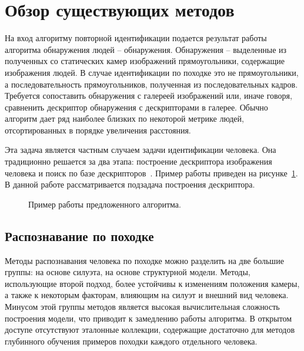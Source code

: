 \documentclass[a4paper,twoside,11pt]{article}
\numberwithin{equation}{section}
\begin{document}
\section{Обзор существующих методов}

На вход алгоритму повторной идентификации подается результат работы алгоритма обнаружения людей -- обнаружения. Обнаружения -- выделенные из полученных со статических камер изображений прямоугольники, содержащие изображения людей. В случае идентификации по походке это не прямоугольники, а последовательность прямоугольников, полученная из последовательных кадров. Требуется сопоставить обнаружения с галереей изображений или, иначе говоря, сравненить дескриптор обнаружения с дескрипторами в галерее. Обычно алгоритм дает ряд наиболее близких по некоторой метрике людей, отсортированных в порядке увеличения расстояния.

Эта задача является частным случаем задачи идентификации человека. Она традиционно решается за два этапа: построение дескриптора изображения человека и поиск по базе дескрипторов~\cite{karanam2016systematic}. Пример работы приведен на рисунке~\ref{rankexample}. В данной работе рассматривается подзадача построения дескриптора.

\begin{figure}[ht]
    \caption{Пример работы предложенного алгоритма.}
    \label{rankexample}
\end{figure}

\subsection{Распознавание по походке}


Методы распознавания человека по походке можно разделить на две большие группы: на основе силуэта, на основе структурной модели. Методы, использующие второй подход, более устойчивы к изменениям положения камеры, а также к некоторым факторам, влияющим на силуэт и внешний вид человека. Минусом этой группы методов является высокая вычислительная сложность построения модели, что приводит к замедлению работы алгоритма. В открытом доступе отсутствуют эталонные коллекции, содержащие достаточно для методов глубинного обучения примеров походки каждого отдельного человека.
\end{document}
